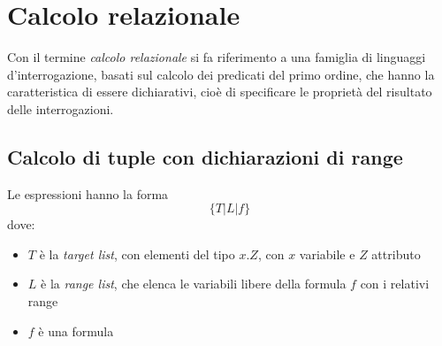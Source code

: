 \documentclass[11pt]{book}
\begin{document}
\section{Calcolo relazionale}
Con il termine \textit{calcolo relazionale} si fa riferimento a una famiglia di linguaggi d'interrogazione, basati sul 
calcolo dei predicati del primo ordine, che hanno la caratteristica di essere dichiarativi, cioè di specificare le proprietà 
del risultato delle interrogazioni.
\subsection{Calcolo di tuple con dichiarazioni di range}
Le espressioni hanno la forma 
\begin{equation*}
    \{T|L|f\}
\end{equation*}
dove:
\begin{itemize}
    \item $T$ è la \textit{target list}, con elementi del tipo $x.Z$, con $x$ variabile e $Z$ attributo
    \item $L$ è la \textit{range list}, che elenca le variabili libere della formula $f$ con i relativi range
    \item $f$ è una formula 
\end{itemize}
\end{document}
